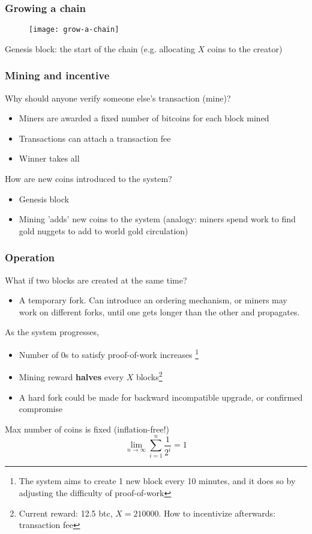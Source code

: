 \documentclass{beamer}
\begin{document}
\begin{frame}
\frametitle{Growing a chain}

\begin{figure}
  \centering
  \texttt{[image: grow-a-chain]}
\end{figure}

Genesis block: the start of the chain (e.g. allocating $X$ coins to the creator)

\end{frame}

\begin{frame}
\frametitle{Mining and incentive}

\vspace{0.2in}
Why should anyone verify someone else's transaction (mine)?
\begin{itemize}
  \item Miners are awarded a fixed number of bitcoins for each block mined
  \item Transactions can attach a transaction fee
  \item Winner takes all
\end{itemize}

\vspace{0.2in}
How are new coins introduced to the system?
\begin{itemize}
  \item Genesis block
  \item Mining 'adds' new coins to the system (analogy: miners spend work to find gold nuggets to add to world gold circulation)
\end{itemize}

\end{frame}

\begin{frame}
\frametitle{Operation}

What if two blocks are created at the same time?
\begin{itemize}
  \item A temporary fork. Can introduce an ordering mechanism, or miners may work on different forks, until one gets longer than the other and propagates.
\end{itemize}

\vspace{0.1in}
As the system progresses,
\begin{itemize}
  \item Number of $0$s to satisfy proof-of-work increases \footnote{The system aims to create 1 new block every 10 minutes, and it does so by adjusting the difficulty of proof-of-work}
  \item Mining reward \textbf{halves} every $X$ blocks\footnote{Current reward: 12.5 btc, $X = 210000$. How to incentivize afterwards: transaction fee}
  \item A hard fork could be made for backward incompatible upgrade, or confirmed compromise
\end{itemize}

\vspace{0.1in}
Max number of coins is fixed (inflation-free!)
$$
\lim\limits_{n \to \infty}{\sum_{i = 1}^{n}{\frac{1}{2^i}}} = 1
$$

\end{frame}
\end{document}
